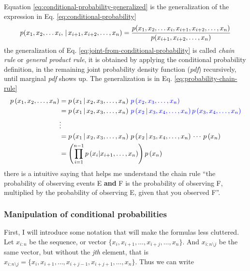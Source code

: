 \documentclass[12pt]{article}
\begin{document}
Equation \ref{eq:conditional-probability-generalized} is the generalization of the expression in Eq. \ref{eq:conditional-probability}
\begin{equation}
    p(x_1, x_2, \dots x_i, \,|\, x_{i+1}, x_{i+2}, \dots, x_n) = \dfrac{p(x_1, x_2, \dots x_i, x_{i+1}, x_{i+2}, \dots, x_n)}{p(x_{i+1}, x_{i+2}, \dots, x_n)}
    \label{eq:conditional-probability-generalized}
\end{equation}
the generalization of Eq. \ref{eq:joint-from-conditional-probability} is called \textit{chain rule} or \textit{general product rule}, it is obtained by applying the conditional probability definition, in the remaining joint probability density function (\textit{pdf}) recursively, until marginal \textit{pdf} shows up. The generalization is in Eq. \ref{eq:probability-chain-rule}
\begin{equation}
    \begin{aligned}
        p\left(x_1, x_2, \dots, x_n\right) &= p\left(x_1 \,|\, x_2, x_3, \dots, x_n\right) \, \color{blue} p\left(x_2, x_3, \dots, x_n\right) \color{black} \\
        &= p\left(x_1 \,|\, x_2, x_3, \dots, x_n\right) \, \color{blue} p\left(x_2 \,|\, x_3, x_4, \dots, x_n\right) p\left(x_3, x_4, \dots, x_n\right)\color{black} \\
        &\vdots\\
        &= p\left(x_1 \,|\, x_2, x_3, \dots, x_n\right) \, p\left(x_2 \,|\, x_3, x_4, \dots, x_n\right) \, \cdots \, p\left(x_n\right) \\
        &= \left(\prod_{i = 1}^{n-1} p\left(x_i | x_{i+1}, \dots, x_{n}\right) \right) p\left(x_n\right)
    \end{aligned}
    \label{eq:probability-chain-rule}
\end{equation}
there is a intuitive saying that helps me understand the chain rule ``the probability of observing events E \textbf{and} F is the probability of observing F, multiplied by the probability of observing E, given that you observed F''.

\subsubsection{Manipulation of conditional probabilities}
First, I will introduce some notation that will make the formulas less cluttered. Let $x_{i:n}$ be the sequence, or vector $\{ x_{i}, x_{i+1}, \dots, x_{i+j}, \dots, x_n\}$. And $x_{i:n \setminus j}$ be the same vector, but without the \textit{jth} element, that is $x_{i:n \setminus j} = \{x_i, x_{i+1}, \dots, x_{i+j-1}, x_{i+j+1}, \dots, x_n\}$. 
Thus we can write 
\end{document}
